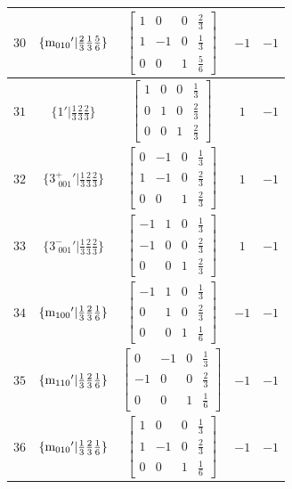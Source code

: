 \documentclass[fleqn,8pt]{jsarticle}
\begin{document}
\begin{longtable}{ccccc}
$ 30 $ & $ \{{\rm m}_{010}{}'|\frac{2}{3} \frac{1}{3} \frac{5}{6}\} $ & $ \begin{bmatrix} 1 & 0 & 0 & \frac{2}{3} \\ 1 & -1 & 0 & \frac{1}{3} \\ 0 & 0 & 1 & \frac{5}{6} \end{bmatrix} $ & $ -1 $ & $ -1 $ \\ \hline
$ 31 $ & $ \{1{}'|\frac{1}{3} \frac{2}{3} \frac{2}{3}\} $ & $ \begin{bmatrix} 1 & 0 & 0 & \frac{1}{3} \\ 0 & 1 & 0 & \frac{2}{3} \\ 0 & 0 & 1 & \frac{2}{3} \end{bmatrix} $ & $ 1 $ & $ -1 $ \\ \hline
$ 32 $ & $ \{3^{+}_{\,\,001}{}'|\frac{1}{3} \frac{2}{3} \frac{2}{3}\} $ & $ \begin{bmatrix} 0 & -1 & 0 & \frac{1}{3} \\ 1 & -1 & 0 & \frac{2}{3} \\ 0 & 0 & 1 & \frac{2}{3} \end{bmatrix} $ & $ 1 $ & $ -1 $ \\ \hline
$ 33 $ & $ \{3^{-}_{\,\,001}{}'|\frac{1}{3} \frac{2}{3} \frac{2}{3}\} $ & $ \begin{bmatrix} -1 & 1 & 0 & \frac{1}{3} \\ -1 & 0 & 0 & \frac{2}{3} \\ 0 & 0 & 1 & \frac{2}{3} \end{bmatrix} $ & $ 1 $ & $ -1 $ \\ \hline
$ 34 $ & $ \{{\rm m}_{100}{}'|\frac{1}{3} \frac{2}{3} \frac{1}{6}\} $ & $ \begin{bmatrix} -1 & 1 & 0 & \frac{1}{3} \\ 0 & 1 & 0 & \frac{2}{3} \\ 0 & 0 & 1 & \frac{1}{6} \end{bmatrix} $ & $ -1 $ & $ -1 $ \\ \hline
$ 35 $ & $ \{{\rm m}_{110}{}'|\frac{1}{3} \frac{2}{3} \frac{1}{6}\} $ & $ \begin{bmatrix} 0 & -1 & 0 & \frac{1}{3} \\ -1 & 0 & 0 & \frac{2}{3} \\ 0 & 0 & 1 & \frac{1}{6} \end{bmatrix} $ & $ -1 $ & $ -1 $ \\ \hline
$ 36 $ & $ \{{\rm m}_{010}{}'|\frac{1}{3} \frac{2}{3} \frac{1}{6}\} $ & $ \begin{bmatrix} 1 & 0 & 0 & \frac{1}{3} \\ 1 & -1 & 0 & \frac{2}{3} \\ 0 & 0 & 1 & \frac{1}{6} \end{bmatrix} $ & $ -1 $ & $ -1 $ \\
\end{longtable}
\end{document}
